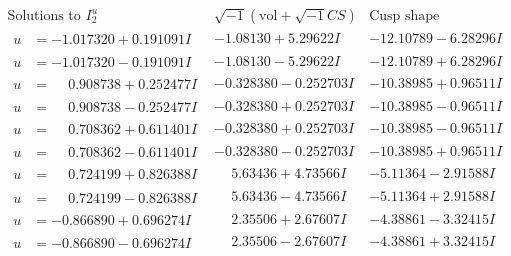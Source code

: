\documentclass[1p]{elsarticle_modified}
\theoremstyle{definition}
\newcommand{\I}{\sqrt{-1}}
\begin{document}
$$\begin{array}{c|c|c}  
\text{Solutions to }I^u_{2}& \I (\text{vol} + \sqrt{-1}CS) & \text{Cusp shape}\\
 \hline 
\begin{aligned}
u &= -1.017320 + 0.191091 I\end{aligned}
 & -1.08130 + 5.29622 I & -12.10789 - 6.28296 I \\ \hline\begin{aligned}
u &= -1.017320 - 0.191091 I\end{aligned}
 & -1.08130 - 5.29622 I & -12.10789 + 6.28296 I \\ \hline\begin{aligned}
u &= \phantom{-}0.908738 + 0.252477 I\end{aligned}
 & -0.328380 - 0.252703 I & -10.38985 + 0.96511 I \\ \hline\begin{aligned}
u &= \phantom{-}0.908738 - 0.252477 I\end{aligned}
 & -0.328380 + 0.252703 I & -10.38985 - 0.96511 I \\ \hline\begin{aligned}
u &= \phantom{-}0.708362 + 0.611401 I\end{aligned}
 & -0.328380 + 0.252703 I & -10.38985 - 0.96511 I \\ \hline\begin{aligned}
u &= \phantom{-}0.708362 - 0.611401 I\end{aligned}
 & -0.328380 - 0.252703 I & -10.38985 + 0.96511 I \\ \hline\begin{aligned}
u &= \phantom{-}0.724199 + 0.826388 I\end{aligned}
 & \phantom{-}5.63436 + 4.73566 I & -5.11364 - 2.91588 I \\ \hline\begin{aligned}
u &= \phantom{-}0.724199 - 0.826388 I\end{aligned}
 & \phantom{-}5.63436 - 4.73566 I & -5.11364 + 2.91588 I \\ \hline\begin{aligned}
u &= -0.866890 + 0.696274 I\end{aligned}
 & \phantom{-}2.35506 + 2.67607 I & -4.38861 - 3.32415 I \\ \hline\begin{aligned}
u &= -0.866890 - 0.696274 I\end{aligned}
 & \phantom{-}2.35506 - 2.67607 I & -4.38861 + 3.32415 I \\ \hline\begin{aligned}

\end{aligned}
\end{array}$$
\end{document}
